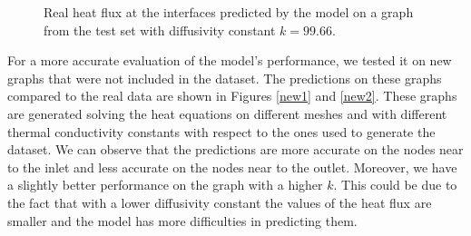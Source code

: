 \documentclass[11pt,a4paper]{article}
\begin{document}
\begin{figure}[H]
    \centering
    \caption{Real heat flux at the interfaces predicted by the model on a graph from the test set with diffusivity constant \(k=99.66\).}
    \label{test}
\end{figure}

For a more accurate evaluation of the model's performance, we tested it on new graphs that were not included in the dataset. 
The predictions on these graphs compared to the real data are shown in Figures \ref{new1} and \ref{new2}. 
These graphs are generated solving the heat equations on different meshes and with different thermal conductivity constants with respect to the ones used to generate the dataset. 
We can observe that the predictions are more accurate on the nodes near to the inlet and less accurate on the nodes near to the outlet. 
Moreover, we have a slightly better performance on the graph with a higher \(k\). 
This could be due to the fact that with a lower diffusivity constant the values of the heat flux are smaller and the model has more difficulties in predicting them.
\end{document}
